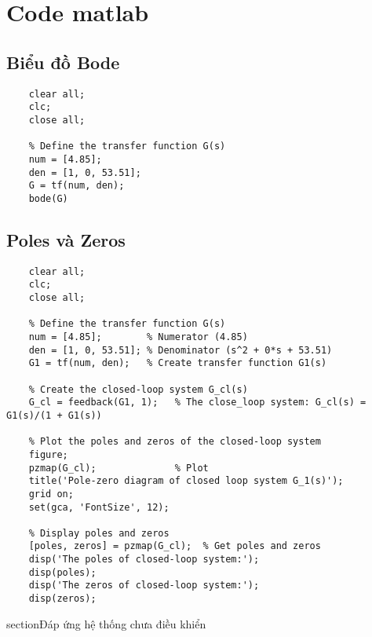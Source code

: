 \chapter{Code matlab}
    \section{Biểu đồ Bode}
    \begin{lstlisting}[caption={Code vẽ biểu đồ Bode}, label={lst:bode}]
    % Delete all variables and close all figures
    clear all;
    clc;
    close all;

    % Define the transfer function G(s)
    num = [4.85];
    den = [1, 0, 53.51];
    G = tf(num, den);
    bode(G)
    \end{lstlisting}
    \section{Poles và Zeros}
    \begin{lstlisting}[caption={Code vẽ poles và zeros}, label={lst:pz}]
    % Delete all variables and close all figures
    clear all;
    clc;
    close all;
    
    % Define the transfer function G(s)
    num = [4.85];        % Numerator (4.85)
    den = [1, 0, 53.51]; % Denominator (s^2 + 0*s + 53.51)
    G1 = tf(num, den);   % Create transfer function G1(s)
    
    % Create the closed-loop system G_cl(s)
    G_cl = feedback(G1, 1);   % The close_loop system: G_cl(s) = G1(s)/(1 + G1(s))
    
    % Plot the poles and zeros of the closed-loop system
    figure;
    pzmap(G_cl);              % Plot
    title('Pole-zero diagram of closed loop system G_1(s)');
    grid on;
    set(gca, 'FontSize', 12);
    
    % Display poles and zeros
    [poles, zeros] = pzmap(G_cl);  % Get poles and zeros
    disp('The poles of closed-loop system:');
    disp(poles);
    disp('The zeros of closed-loop system:');
    disp(zeros);
    \end{lstlisting}
    section{Đáp ứng hệ thống chưa điều khiển}
